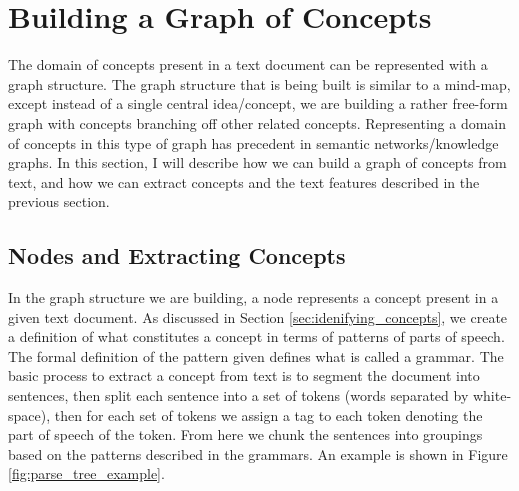 \documentclass[12pt]{article}
\theoremstyle{grammarstyle}
\begin{document}
\section{Building a Graph of Concepts} \label{sec:building_a_graph_of_concepts}
The domain of concepts present in a text document can be represented with a graph structure. The graph structure that is being built is similar to a mind-map, except instead of a single central idea/concept, we are building a rather free-form graph with concepts branching off other related concepts. Representing a domain of concepts in this type of graph has precedent in semantic networks/knowledge graphs.
In this section, I will describe how we can build a graph of concepts from text, and how we can extract concepts and the text features described in the previous section.

\subsection{Nodes and Extracting Concepts}
In the graph structure we are building, a node represents a concept present in a given text document. As discussed in Section \ref{sec:idenifying_concepts}, we create a definition of what constitutes a concept in terms of patterns of parts of speech. The formal definition of the pattern given defines what is called a grammar. The basic process to extract a concept from text is to segment the document into sentences, then split each sentence into a set of tokens (words separated by white-space), then for each set of tokens we assign a tag to each token denoting the part of speech of the token. From here we chunk the sentences into groupings based on the patterns described in the grammars. An example is shown in Figure \ref{fig:parse_tree_example}.
\end{document}
